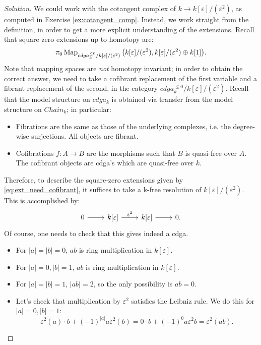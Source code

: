 \documentclass[10pt,a4paper,reqno,oneside]{book} %
\theoremstyle{plain}
\theoremstyle{definition}
\theoremstyle{remark}
\numberwithin{equation}{section}
\begin{document}
\ifpersonal
\begin{proof}[Solution]
We could work with the cotangent complex of $k \to k[\varepsilon]/(\varepsilon^2)$, as computed in Exercise \ref{ex:cotangent_comp}.
Instead, we work straight from the definition, in order to get a more explicit understanding of the extensions. Recall that square
zero extensions up to homotopy are:
\begin{equation}
\label{eq:ext_need_cofibrant}
	\pi_0 \operatorname{Map}_{cdga_k^{\leq 0} / k[\varepsilon]/(\varepsilon^2)} \big( k[\varepsilon]/(\varepsilon^2) ,
k[\varepsilon]/(\varepsilon^2) \oplus k[1] \big).
\end{equation}
Note that mapping spaces are \emph{not} homotopy invariant; in order to obtain the correct answer, we need to take a cofibrant
replacement of the first variable and a fibrant replacement of the second, in the category 
$cdga_k^{\leq 0} / k[\varepsilon]/(\varepsilon^2)$. Recall that the model structure on $cdga_k$ is obtained via transfer
from the model structure on $Chain_k$; in particular:
\begin{itemize}
\item Fibrations are the same as those of the underlying complexes, i.e. the degree-wise surjections. All objects are fibrant.
\item Cofibrations $f:A \to B$ are the morphisms such that $B$ is quasi-free over $A$. The cofibrant objects
are cdga's which are quasi-free over $k$.
\end{itemize}
Therefore, to describe the square-zero extensions given by \ref{eq:ext_need_cofibrant}, it suffices to take a k-free resolution
of $k[\varepsilon]/(\varepsilon^2)$. This is accomplished by:
\[
\begin{tikzcd}
0 \arrow{r} & k[\varepsilon]\arrow{r}{\varepsilon^2} & k[\varepsilon]\arrow{r} & 0 .
\end{tikzcd}
\]
Of course, one needs to check that this gives indeed a cdga.
\begin{itemize}
\item For $|a| = |b| = 0$, $ab$ is ring multiplication in $k[\varepsilon]$.
\item For $|a| = 0, |b| = 1$, $ab$ is ring multiplication in $k[\varepsilon]$.
\item For $|a| = |b| = 1$, $|ab| = 2$, so the only possibility is $ab = 0$.
\item Let's check that multiplication by $\varepsilon^2$ satisfies the Leibniz rule. We do this for $|a| = 0, |b| = 1$:
\[ \varepsilon^2(a) \cdot b + (-1)^{|a|} a \varepsilon^2(b) = 0 \cdot b + (-1)^0 a \varepsilon^2 b = \varepsilon^2 (ab). \]
\end{itemize}


\end{proof}
\end{document}
